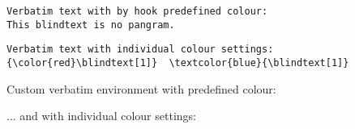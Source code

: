 \documentclass{article}
\begin{document}
\blindtext[1]

\begin{Verbatim}
Verbatim text with by hook predefined colour:
This blindtext is no pangram.
\end{Verbatim}

\begin{Verbatim}[commandchars=\\\{\}]
Verbatim text with individual colour settings:
{\color{red}\blindtext[1]}  \textcolor{blue}{\blindtext[1]}
\end{Verbatim}

\begin{ColorVerbatim}
Custom verbatim environment with predefined colour:
\blindtext[1]

... and with individual colour settings:
\textcolor{orange}{\blindtext[1]}
{\color{teal}\blindtext[1]}
\end{ColorVerbatim}

\blindtext[1]
\end{document}
